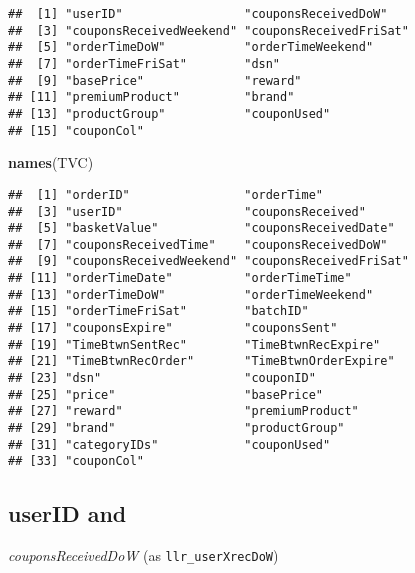 \documentclass[10pt]{report}
\newenvironment{Shaded}{}{}
\newcommand{\KeywordTok}[1]{\textcolor[rgb]{0.00,0.44,0.13}{\textbf{{#1}}}}
\newcommand{\NormalTok}[1]{{#1}}
\begin{document}
\begin{verbatim}
##  [1] "userID"                 "couponsReceivedDoW"    
##  [3] "couponsReceivedWeekend" "couponsReceivedFriSat" 
##  [5] "orderTimeDoW"           "orderTimeWeekend"      
##  [7] "orderTimeFriSat"        "dsn"                   
##  [9] "basePrice"              "reward"                
## [11] "premiumProduct"         "brand"                 
## [13] "productGroup"           "couponUsed"            
## [15] "couponCol"
\end{verbatim}

\begin{Shaded}
\begin{Highlighting}[]
\KeywordTok{names}\NormalTok{(TVC)}
\end{Highlighting}
\end{Shaded}

\begin{verbatim}
##  [1] "orderID"                "orderTime"             
##  [3] "userID"                 "couponsReceived"       
##  [5] "basketValue"            "couponsReceivedDate"   
##  [7] "couponsReceivedTime"    "couponsReceivedDoW"    
##  [9] "couponsReceivedWeekend" "couponsReceivedFriSat" 
## [11] "orderTimeDate"          "orderTimeTime"         
## [13] "orderTimeDoW"           "orderTimeWeekend"      
## [15] "orderTimeFriSat"        "batchID"               
## [17] "couponsExpire"          "couponsSent"           
## [19] "TimeBtwnSentRec"        "TimeBtwnRecExpire"     
## [21] "TimeBtwnRecOrder"       "TimeBtwnOrderExpire"   
## [23] "dsn"                    "couponID"              
## [25] "price"                  "basePrice"             
## [27] "reward"                 "premiumProduct"        
## [29] "brand"                  "productGroup"          
## [31] "categoryIDs"            "couponUsed"            
## [33] "couponCol"
\end{verbatim}

\subsection{userID and}\label{userid-and}

\emph{couponsReceivedDoW} (as \texttt{llr\_userXrecDoW})
\end{document}
